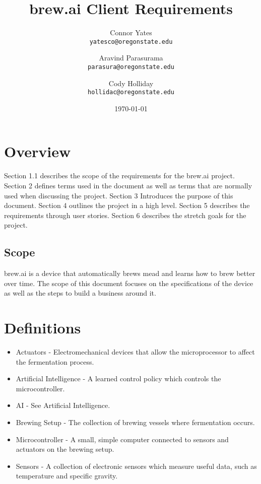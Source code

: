 \documentclass[draftclsnofoot,onecolumn,letterpaper,10pt]{IEEEtran}
\author{Connor Yates\\
\texttt{yatesco@oregonstate.edu\\}
\and
Aravind Parasurama\\
\texttt{parasura@oregonstate.edu\\}
\and
Cody Holliday\\
\texttt{hollidac@oregonstate.edu\\}}
\date{\today}
\title{brew.ai Client Requirements}
\begin{document}
\maketitle

\newpage
\tableofcontents
\newpage
\section{Overview}
Section 1.1 describes the scope of the requirements for the brew.ai project.
Section 2 defines terms used in the document as well as terms that are normally used when discussing the project.
Section 3 Introduces the purpose of this document.
Section 4 outlines the project in a high level.
Section 5 describes the requirements through user stories.
Section 6 describes the stretch goals for the project.

\subsection{Scope}
brew.ai is a device that automatically brews mead and learns how to brew better over time.
The scope of this document focuses on the specifications of the device as well 
as the steps to build a business around it.

\section{Definitions}
\begin{itemize}
	\item Actuators - Electromechanical devices that allow the microprocessor to 
		affect the fermentation process.
	\item Artificial Intelligence - A learned control policy which controls 
		the microcontroller.
	\item AI - See Artificial Intelligence.
	\item Brewing Setup - The collection of brewing vessels where fermentation 
		occurs.
	\item Microcontroller - A small, simple computer connected to sensors and 
		actuators on the brewing setup.
	\item Sensors - A collection of electronic sensors which measure useful data, 
		such as temperature and specific gravity.
\end{itemize}
\end{document}
